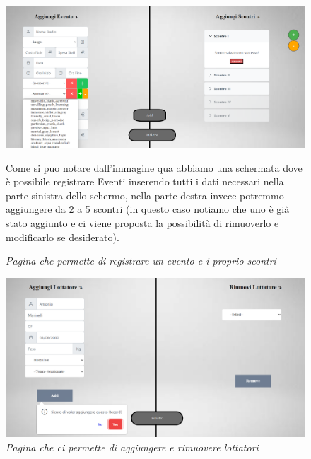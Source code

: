 \documentclass[a4paper,12pt]{report}
\begin{document}
\begin{figure}
    \centering
    \includegraphics[scale=0.35]{./img/eventoAdd.png}
    \caption{\textit{Pagina che permette di registrare un evento e i proprio scontri}}
    \medskip
    Come si puo notare dall'immagine qua abbiamo una schermata dove è possibile registrare Eventi inserendo tutti i dati necessari nella 
    parte sinistra dello schermo, nella parte destra invece potremmo aggiungere da 2 a 5 scontri (in questo caso notiamo che 
    uno è già stato aggiunto e ci viene proposta la possibilità di rimuoverlo e modificarlo se desiderato).
    \label{addEvento}
\end{figure}

\begin{figure}
    \centering
    \includegraphics[scale=0.4]{./img/AddLottatore.png}
    \caption{\textit{Pagina che ci permette di aggiungere e rimuovere lottatori}}
\end{figure}
\end{document}
